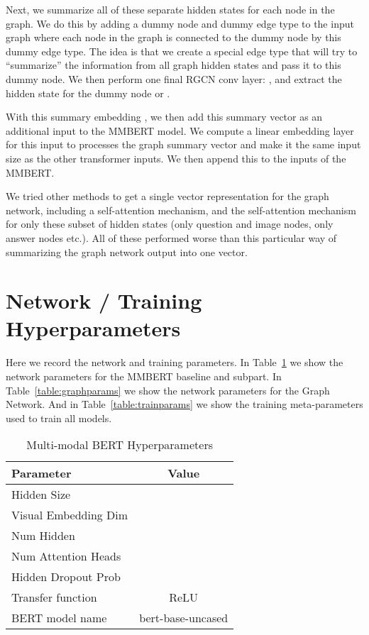 \documentclass[final]{cvpr}
\providecommand{\MMBERTBase}{Multi-modal BERT\xspace}
\providecommand{\MMBERTAbr}{MMBERT\xspace}
\begin{document}
Next, we summarize all of these separate hidden states  for each node  in the graph. We do this by adding a dummy node and dummy edge type to the input graph where each node in the graph is connected to the dummy node by this dummy edge type. The idea is that we create a special edge type that will try to ``summarize'' the information from all graph hidden states and pass it to this dummy node. We then perform one final RGCN conv layer: , and extract the hidden state for the dummy node  or . 

With this summary embedding , we then add this summary vector as an additional input to the \MMBERTAbr model. We compute a linear embedding layer for this input to processes the graph summary vector and make it the same input size as the other transformer inputs. We then append this to the inputs of the \MMBERTAbr. 

We tried other methods to get a single vector representation for the graph network, including a self-attention mechanism, and the self-attention mechanism for only these subset of hidden states (only question and image nodes, only answer nodes etc.). All of these performed worse than this particular way of summarizing the graph network output into one vector.

\section{Network / Training Hyperparameters}
\label{appx:hyper}
Here we record the network and training parameters.
In Table~\ref{table:mmbertparams} we show the network parameters for the \MMBERTAbr baseline and subpart.
In Table~\ref{table:graphparams} we show the network parameters for the Graph Network. 
And in Table~\ref{table:trainparams} we show the training meta-parameters used to train all models.

\begin{table}[h]
\begin{center}
\begin{tabular}{@{}lc@{}}
\toprule
Parameter & Value\\ \midrule
Hidden Size &  \\
Visual Embedding Dim &  \\
Num Hidden &  \\
Num Attention Heads &  \\
Hidden Dropout Prob &  \\
Transfer function & ReLU \\
BERT model name & bert-base-uncased \\
\bottomrule
\end{tabular}
\end{center}
\caption{\MMBERTBase Hyperparameters}
\label{table:mmbertparams}
\end{table}
\end{document}
